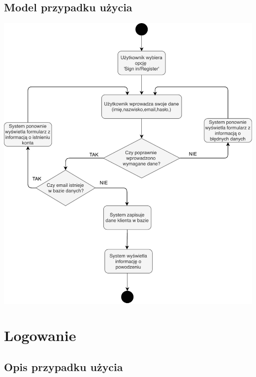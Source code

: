 \documentclass[12pt]{report}
\begin{document}
	\subsection{Model przypadku użycia}
	\begin{center}
		\includegraphics[width=400pt]{rejstracja.pdf}
	\end{center}
	
	\newpage

\section{Logowanie}
	\subsection {Opis przypadku użycia}
	
\end{document}
